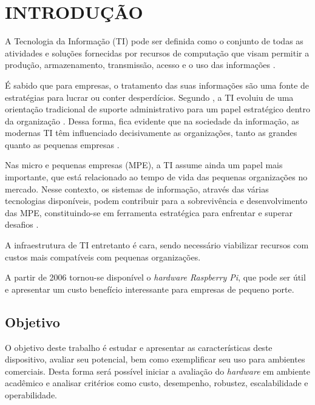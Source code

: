 \chapter{INTRODUÇÃO}

A Tecnologia da Informação (TI) pode ser definida como o conjunto de todas as atividades e soluções fornecidas por recursos de computação que visam permitir a produção, armazenamento, transmissão, acesso e o uso das informações \cite{WIKIPEDIA}.

É sabido que para empresas, o tratamento das suas informações são uma fonte de estratégias para lucrar ou conter desperdícios. Segundo , a TI evoluiu de uma orientação tradicional de suporte administrativo para um papel estratégico dentro da organização . Dessa forma, fica evidente que na sociedade da informação, as modernas TI têm influenciado decisivamente as organizações, tanto as grandes quanto as pequenas empresas \cite{CRISTINA}.

Nas micro e pequenas empresas (MPE), a TI assume ainda um papel mais importante, que está relacionado ao tempo de vida das pequenas organizações no mercado. Nesse contexto, os sistemas de informação, através das várias tecnologias disponíveis, podem contribuir para a sobrevivência e desenvolvimento das MPE, constituindo-se em ferramenta estratégica para enfrentar e superar desafios \cite{VALDIR}.

A infraestrutura de TI entretanto é cara, sendo necessário viabilizar recursos com custos mais compatíveis com pequenas organizações.

A partir de 2006 tornou-se disponível o \textit{hardware Raspberry Pi},  que pode ser útil e apresentar um custo benefício interessante para empresas de pequeno porte.

\section{Objetivo}

O objetivo deste trabalho é estudar e apresentar as características deste dispositivo, avaliar seu potencial, bem como exemplificar seu uso para ambientes comerciais. Desta forma será possível iniciar a avaliação do \textit{hardware} em ambiente acadêmico e analisar critérios como custo, desempenho, robustez, escalabilidade e operabilidade.
